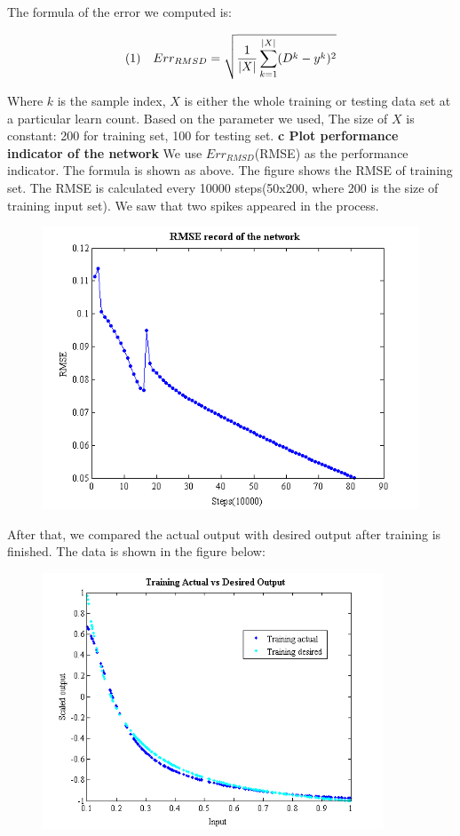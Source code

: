 \documentclass[epsfig]{article}
\def\bpar{\vskip26pt}
\def\npar{\vskip13pt}
\def\spar{\vskip10pt}
\begin{document}
The formula of the error we computed is:

$$(1)\ \ \ Err_{RMSD}= \sqrt{{1\over{|X|}}\sum_{k=1}^{|X|}(D^k-y^k)^2}$$

Where $k$ is the sample index, $X$ is either the whole training or testing data set at a particular learn count. Based on the parameter we used, The size of $X$ is constant: 200 for training set, 100 for testing set.
\spar
\spar
\spar
\spar
{\bf 
	\npar
	c Plot performance indicator of the network
	\bpar
}
We use $Err_{RMSD}$(RMSE) as the performance indicator. The formula is shown as above. The figure shows the RMSE of training set. The RMSE is calculated every 10000 steps(50x200, where 200 is the size of training input set). We saw that  two spikes appeared in the process.

\begin{figure}[!htb] 
	\centering\includegraphics[width=4.5in]{fig1.png} 
\end{figure} 

\spar

After that, we compared the actual output with desired output after training is finished. The data is shown in the figure below:

\begin{figure}[!htb] 
	\centering\includegraphics[width=4in]{fig2.png} 
\end{figure} 
\end{document}

